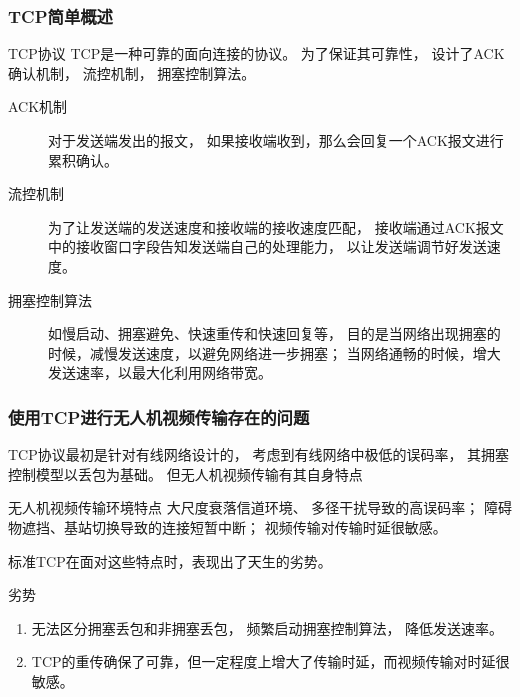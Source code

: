 \begin{frame}
	\frametitle{TCP简单概述}
	\begin{block}{TCP协议}
		\footnotesize
		TCP是一种可靠的面向连接的协议。
		为了保证其可靠性，
		设计了ACK确认机制，
		流控机制，
		拥塞控制算法。
		\begin{description}
			\item[ACK机制] 对于发送端发出的报文，
			如果接收端收到，那么会回复一个ACK报文进行累积确认。
			\item[流控机制] 为了让发送端的发送速度和接收端的接收速度匹配，
			接收端通过ACK报文中的接收窗口字段告知发送端自己的处理能力，
			以让发送端调节好发送速度。
			\item[拥塞控制算法] 如慢启动、拥塞避免、快速重传和快速回复等，
			目的是当网络出现拥塞的时候，减慢发送速度，以避免网络进一步拥塞；
			当网络通畅的时候，增大发送速率，以最大化利用网络带宽。
		\end{description}

	\end{block}
\end{frame}
\begin{frame}
	\frametitle{使用TCP进行无人机视频传输存在的问题}
	TCP协议最初是针对有线网络设计的，
	考虑到有线网络中极低的误码率，
	其拥塞控制模型以丢包为基础。
	但无人机视频传输有其自身特点
	\begin{block}{无人机视频传输环境特点}
		\footnotesize
		大尺度衰落信道环境、
		多径干扰导致的高误码率；
		障碍物遮挡、基站切换导致的连接短暂中断；
		视频传输对传输时延很敏感。
	\end{block}
	标准TCP在面对这些特点时，表现出了天生的劣势。
	\begin{block}{劣势}
		\footnotesize
		\begin{enumerate}[(1)]
			\item 无法区分拥塞丢包和非拥塞丢包，
			频繁启动拥塞控制算法，
			降低发送速率。
			\item TCP的重传确保了可靠，但一定程度上增大了传输时延，而视频传输对时延很敏感。
		\end{enumerate}
	\end{block}
\end{frame}
